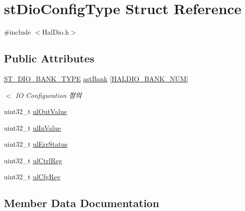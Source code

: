 \hypertarget{structst_dio_config_type}{}\section{st\+Dio\+Config\+Type Struct Reference}
\label{structst_dio_config_type}


{\ttfamily \#include $<$Hal\+Dio.\+h$>$}

\subsection*{Public Attributes}
\begin{DoxyCompactItemize}
\item 
\mbox{\hyperlink{_hal_dio_8h_a264031ef9e065b0d942b5cd1af5c9a53}{S\+T\+\_\+\+D\+I\+O\+\_\+\+B\+A\+N\+K\+\_\+\+T\+Y\+PE}} \mbox{\hyperlink{structst_dio_config_type_a88dc08fb7e71a9bc953f9f7bab77cddd}{ast\+Bank}} \mbox{[}\mbox{\hyperlink{_hal_dio_8h_a94973dd2f20e4cd2c5de1de2bfc6bfac}{H\+A\+L\+D\+I\+O\+\_\+\+B\+A\+N\+K\+\_\+\+N\+UM}}\mbox{]}
\begin{DoxyCompactList}\small\item\em $<$ IO Configuration 정의 \end{DoxyCompactList}\item 
uint32\+\_\+t \mbox{\hyperlink{structst_dio_config_type_a33bf717e514759f7707e6a2e5a2774d7}{ul\+Out\+Value}}
\item 
uint32\+\_\+t \mbox{\hyperlink{structst_dio_config_type_a687de07edb515b4a46b018d3b706f399}{ul\+In\+Value}}
\item 
uint32\+\_\+t \mbox{\hyperlink{structst_dio_config_type_a39af377a3e22d2b05cc9567c0dcedbf9}{ul\+Err\+Status}}
\item 
uint32\+\_\+t \mbox{\hyperlink{structst_dio_config_type_a6f2f31e4c047d2fc7d8eaaf8c0f46371}{ul\+Ctrl\+Reg}}
\item 
uint32\+\_\+t \mbox{\hyperlink{structst_dio_config_type_ac394a624bb8168e76b20a651037ad30c}{ul\+Cfg\+Reg}}
\end{DoxyCompactItemize}


\subsection{Member Data Documentation}
\mbox{\label{structst_dio_config_type_a88dc08fb7e71a9bc953f9f7bab77cddd}} 
